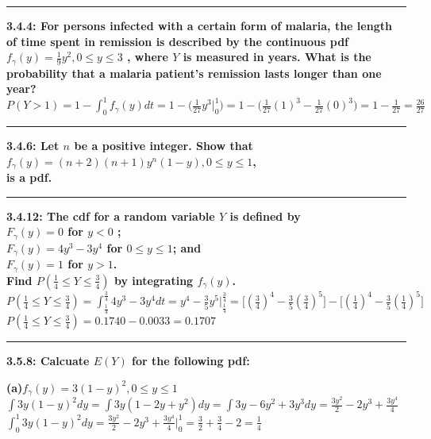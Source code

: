 \documentclass[11pt]{article}
\newcommand\question[2]{\vspace{.25in}\hrule\textbf{#1: #2}\vspace{.5em}\vspace{.10in}}
\renewcommand\part[1]{\vspace{.10in}\textbf{(#1)}}
\begin{document}
\raggedright
\newcommand\NAME{Jonathan Lopez}  %
\newcommand\HWNUM{3}              %



\question{3.4.4}
{For persons infected with a certain form of malaria, the length of time spent in
remission is described by the continuous pdf 
$f_{\gamma} (y) = \frac{1}{9}y^{2},0 \leq y \leq 3$
, where $Y$ is measured in years. What is the probability that a malaria patient's
remission lasts longer than one year?} \\
$
P(Y > 1) 
= 
1 - \int_{0}^{1}f_{\gamma}(y)dt 
= 
1 - \Big(\frac{1}{27}y^{3} \Big|_{0}^{1}\Big)
=
1 - \Big(\frac{1}{27}(1)^{3}-\frac{1}{27}(0)^{3}\Big)
=
1 - \frac{1}{27}
=
\frac{26}{27}
$


\question{3.4.6}
{Let $n$ be a positive integer. Show that
\\
$f_{\gamma} (y) = (n+2)(n+1)y^{n}(1-y),0 \leq y \leq 1$,
\\
is a pdf.}


\question{3.4.12}
{The cdf for a random variable $Y$ is defined by \\
$F_{\gamma} (y) = 0$ for $y < 0$ ;\\
$F_{\gamma} (y) = 4y^{3}-3y^{4}$ for $0 \leq y \leq 1$; and \\
$F_{\gamma} (y) = 1$ for $y > 1$.\\
Find 
$P(\frac{1}{4} \leq Y \leq \frac{3}{4})$
by integrating $f_{\gamma} (y)$.
}
\\
$
P(\frac{1}{4} \leq Y \leq \frac{3}{4})
=
\int_{\frac{1}{4}}^{\frac{3}{4}}4y^{3}-3y^{4}dt
=
y^{4}-\frac{3}{5}y^{5} \Big|_{\frac{1}{4}}^{\frac{3}{4}}
=
\Big[(\frac{3}{4})^4-\frac{3}{5}(\frac{3}{4})^{5}\Big]
-
\Big[(\frac{1}{4})^4-\frac{3}{5}(\frac{1}{4})^{5}\Big]
$
\\
$
P(\frac{1}{4} \leq Y \leq \frac{3}{4}) 
= 0.1740 - 0.0033 = 0.1707
$

\question{3.5.8}
{Calcuate $E(Y)$ for the following pdf:}

\part{a}$f_{\gamma} (y) = 3(1-y)^{2}, 0 \leq y \leq 1$
\\
$
\int 3y(1-y)^{2}dy 
= 
\int 3y(1 - 2y + y^{2})dy
=
\int 3y - 6y^{2} + 3y^{3} dy
=
\frac{3y^{2}}{2} - 2y^{3} + \frac{3y^{4}}{4}
$
\\
$
\int_{0}^{1} 3y(1-y)^{2}dy 
=
\frac{3y^{2}}{2} - 2y^{3} + \frac{3y^{4}}{4} \Big|_{0}^{1}
=
\frac{3}{2} + \frac{3}{4} - 2 = \frac{1}{4}
$
\\ 
\end{document}
